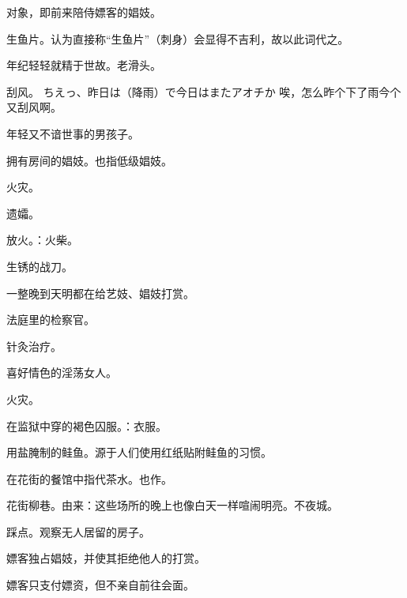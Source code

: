 

\orignextpage

{对象，即前来陪侍嫖客的娼妓。}

{生鱼片。认为直接称“生鱼片”（刺身）会显得不吉利，故以此词代之。}

{年纪轻轻就精于世故。老滑头。} %

{刮风。
  \itemquote
  {ちえっ、昨日は（降雨）で今日はまたアオチか}
{唉，怎么昨个下了雨今个又刮风啊。}}

{年轻又不谙世事的男孩子。}

{拥有房间的娼妓。也指低级娼妓。}

{火灾。}

{遗孀。}

{放火。：火柴。}

{生锈的战刀。}

{一整晚到天明都在给艺妓、娼妓打赏。}

{法庭里的检察官。}

{针灸治疗。}

{喜好情色的淫荡女人。}

{火灾。}

{在监狱中穿的褐色囚服。：衣服。}

{用盐腌制的鲑鱼。源于人们使用红纸贴附鲑鱼的习惯。}

{在花街的餐馆中指代茶水。也作。}

{花街柳巷。由来：这些场所的晚上也像白天一样喧闹明亮。不夜城。}

{踩点。观察无人居留的房子。}

{嫖客独占娼妓，并使其拒绝他人的打赏。}

{嫖客只支付嫖资，但不亲自前往会面。}

